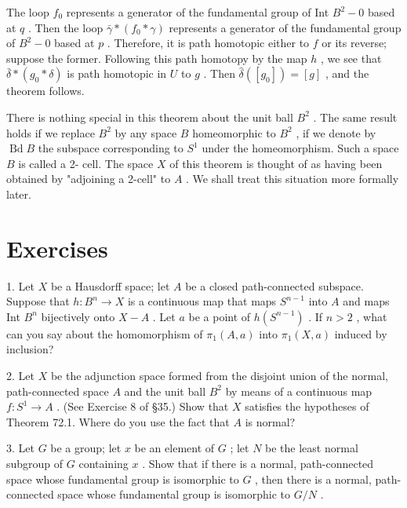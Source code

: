 The loop \({f}_{0}\) represents a generator of the fundamental group of Int \({B}^{2} - 0\) based at \(q\) . Then the loop \(\bar{\gamma } * \left( {{f}_{0} * \gamma }\right)\) represents a generator of the fundamental group of \({B}^{2} - 0\) based at \(p\) . Therefore, it is path homotopic either to \(f\) or its reverse; suppose the former. Following this path homotopy by the map \(h\) , we see that \(\bar{\delta } * \left( {{g}_{0} * \delta }\right)\) is path homotopic in \(U\) to \(g\) . Then \(\widehat{\delta }\left( \left\lbrack  {g}_{0}\right\rbrack  \right)  = \left\lbrack  g\right\rbrack\) , and the theorem follows.

There is nothing special in this theorem about the unit ball \({B}^{2}\) . The same result holds if we replace \({B}^{2}\) by any space \(B\) homeomorphic to \({B}^{2}\) , if we denote by \(\operatorname{Bd}B\) the subspace corresponding to \({S}^{1}\) under the homeomorphism. Such a space \(B\) is called a 2- cell. The space \(X\) of this theorem is thought of as having been obtained by "adjoining a 2-cell" to \(A\) . We shall treat this situation more formally later.

\section*{Exercises}

1. Let \(X\) be a Hausdorff space; let \(A\) be a closed path-connected subspace. Suppose that \(h : {B}^{n} \rightarrow  X\) is a continuous map that maps \({S}^{n - 1}\) into \(A\) and maps Int \({B}^{n}\) bijectively onto \(X - A\) . Let \(a\) be a point of \(h\left( {S}^{n - 1}\right)\) . If \(n > 2\) , what can you say about the homomorphism of \({\pi }_{1}\left( {A,a}\right)\) into \({\pi }_{1}\left( {X,a}\right)\) induced by inclusion?

2. Let \(X\) be the adjunction space formed from the disjoint union of the normal, path-connected space \(A\) and the unit ball \({B}^{2}\) by means of a continuous map \(f : {S}^{1} \rightarrow  A\) . (See Exercise 8 of  \S 35.) Show that \(X\) satisfies the hypotheses of Theorem 72.1. Where do you use the fact that \(A\) is normal?

3. Let \(G\) be a group; let \(x\) be an element of \(G\) ; let \(N\) be the least normal subgroup of \(G\) containing \(x\) . Show that if there is a normal, path-connected space whose fundamental group is isomorphic to \(G\) , then there is a normal, path-connected space whose fundamental group is isomorphic to \(G/N\) .

